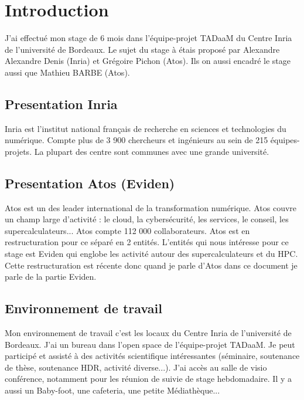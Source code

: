 \section{Introduction}

J'ai effectué mon stage de 6 mois dans l'équipe-projet TADaaM du Centre Inria de l'université de Bordeaux.
Le sujet du stage à étais proposé par Alexandre Alexandre Denis (Inria) et Grégoire Pichon (Atos).
Ils on aussi encadré le stage aussi que Mathieu BARBE (Atos).

\subsection{Presentation Inria}

Inria est l'institut national français de recherche en sciences et technologies du numérique.
Compte plus de 3 900 chercheurs et ingénieurs au sein de 215 équipes-projets.
La plupart des centre sont communes avec une grande université.


\subsection{Presentation Atos (Eviden)}

Atos est un des leader international de la transformation numérique.
Atos couvre un champ large d'activité : le cloud, la cybersécurité, les services, le conseil, les supercalculateurs...
Atos compte 112 000 collaborateurs.
Atos est en restructuration pour ce séparé en 2 entités.
L'entités qui nous intéresse pour ce stage est Eviden qui englobe les activité autour des supercalculateurs et du HPC.
Cette restructuration est récente donc quand je parle d'Atos dans ce document je parle de la partie Eviden.


\subsection{Environnement de travail}

Mon environnement de travail c'est les locaux du Centre Inria de l'université de Bordeaux.
J'ai un bureau dans l'open space de l'équipe-projet TADaaM.
Je peut participé et assisté à des activités scientifique intéressantes (séminaire, soutenance de thèse, soutenance HDR, activité diverse...).
J'ai accès au salle de visio conférence, notamment pour les réunion de suivie de stage hebdomadaire.
Il y a aussi un Baby-foot, une cafeteria, une petite Médiathèque...

